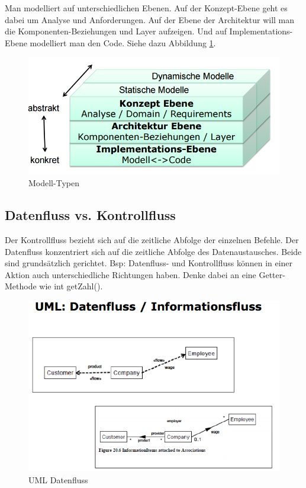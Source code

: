 Man modelliert auf unterschiedlichen Ebenen. Auf der Konzept-Ebene geht es dabei um Analyse und Anforderungen. Auf der Ebene der Architektur will man die Komponenten-Beziehungen und Layer aufzeigen. Und auf Implementations-Ebene modelliert man den Code. Siehe dazu Abbildung \ref{fig:modelltypen}.

\begin{figure}[h!]
\centering
\includegraphics[width=0.7\linewidth]{fig/modelltypen}
\caption{Modell-Typen}
\label{fig:modelltypen}
\end{figure}

\subsection{Datenfluss vs. Kontrollfluss}
Der Kontrollfluss bezieht sich auf die zeitliche Abfolge der einzelnen Befehle. Der Datenfluss konzentriert sich auf die zeitliche Abfolge des Datenaustausches. Beide sind grundsätzlich gerichtet. Bsp: Datenfluss- und Kontrollfluss können in einer Aktion auch unterschiedliche Richtungen haben. Denke dabei an eine Getter-Methode wie int getZahl().

\begin{figure}[h!]
	\centering
	\includegraphics[width=0.7\linewidth]{fig/uml-datenfluss}
	\caption{UML Datenfluss}
	\label{fig:uml-datenfluss}
\end{figure}

